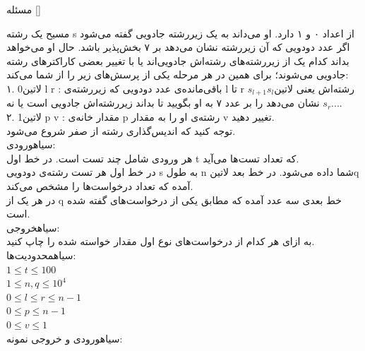 

‌مسئله []

مسیح یک رشته s از اعداد ۰ و ۱ دارد. او می‌داند به یک زیررشته جادویی گفته می‌شود اگر عدد دودویی که آن زیررشته نشان می‌دهد بر ۷ بخش‌پذیر باشد. حال او می‌خواهد بداند کدام یک از زیررشته‌های رشته‌اش جادویی‌اند یا با تغییر بعضی کاراکترهای رشته جادویی می‌شوند؛ برای همین در هر مرحله یکی از پرسش‌های زیر را از شما می‌کند: \\
۱. ‌لاتین{0 l r} : باقی‌مانده‌ی عدد دودویی که زیررشته‌ی l تا r رشته‌اش یعنی ‌لاتین{$s_l$$s_{l+1}$...$s_r$} ‌ نشان می‌دهد
 را بر عدد ۷ به او بگویید تا بداند زیررشته‌اش جادویی است یا نه.\\
۲. ‌لاتین{1 p v } : مقدار خانه‌ی p رشته‌ی او را به مقدار v تغییر دهید.\\
توجه کنید که اندیس‌گذاری رشته از صفر شروع می‌شود. \\

‌سیاه{ورودی:}\\
هر ورودی شامل چند تست است. در خط اول t که تعداد تست‌ها می‌آید.\\
در خط اول هر تست رشته‌ی دودویی s به طول n شما داده می‌شود. در خط بعد  ‌لاتین{q} آمده که تعداد درخواست‌ها را مشخص می‌کند.\\ 
در هر یک از q خط بعدی سه عدد آمده که مطابق یکی از درخواست‌های گفته شده است.\\


‌سیاه{خروجی:}\\
به ازای هر کدام از درخواست‌های نوع اول مقدار خواسته شده را چاپ کنید.\\

‌سیاه{محدودیت‌ها:}\\
$1 \leq t \leq 100$\\
$1 \leq n, q \leq 10^{4}$\\
$0 \leq l \leq r \leq n - 1$\\
$0 \leq p \leq n - 1$\\
$0 \leq v \leq 1$\\

‌سیاه{ورودی و خروجی نمونه:}\\

